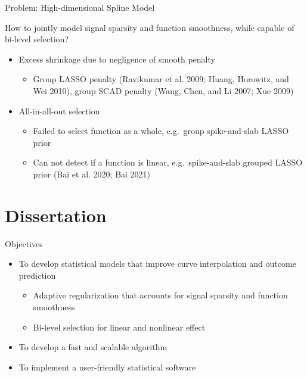 \documentclass[
  ignorenonframetext,
  aspectratio=169]{beamer}
\providecommand{\tightlist}{%
  \setlength{\itemsep}{0pt}\setlength{\parskip}{0pt}}
\begin{document}
\begin{frame}{Problem: High-dimensional Spline Model}
\protect\hypertarget{problem-high-dimensional-spline-model}{}
\begin{tcolorbox}[colback=green!5,colframe=green!40!black,title=Question]
How to jointly model signal sparsity and function smoothness, while capable of bi-level selection?
\end{tcolorbox}

\begin{itemize}
\tightlist
\item
  Excess shrinkage due to negligence of smooth penalty

  \begin{itemize}
  \tightlist
  \item
    Group LASSO penalty (Ravikumar et al. 2009; Huang, Horowitz, and Wei
    2010), group SCAD penalty (Wang, Chen, and Li 2007; Xue 2009)
  \end{itemize}
\item
  All-in-all-out selection

  \begin{itemize}
  \tightlist
  \item
    Failed to select function as a whole, e.g.~group spike-and-slab
    LASSO prior
  \item
    Can not detect if a function is linear, e.g.~spike-and-slab grouped
    LASSO prior (Bai et al. 2020; Bai 2021)
  \end{itemize}
\end{itemize}
\end{frame}

\hypertarget{dissertation}{%
\section{Dissertation}\label{dissertation}}

\begin{frame}{Objectives}
\protect\hypertarget{objectives}{}
\begin{itemize}
\tightlist
\item
  To develop statistical models that improve curve interpolation and
  outcome prediction

  \begin{itemize}
  \tightlist
  \item
    Adaptive regularization that accounts for signal sparsity and
    function smoothness
  \item
    Bi-level selection for linear and nonlinear effect
  \end{itemize}
\item
  To develop a fast and scalable algorithm
\item
  To implement a user-friendly statistical software
\end{itemize}
\end{frame}
\end{document}
